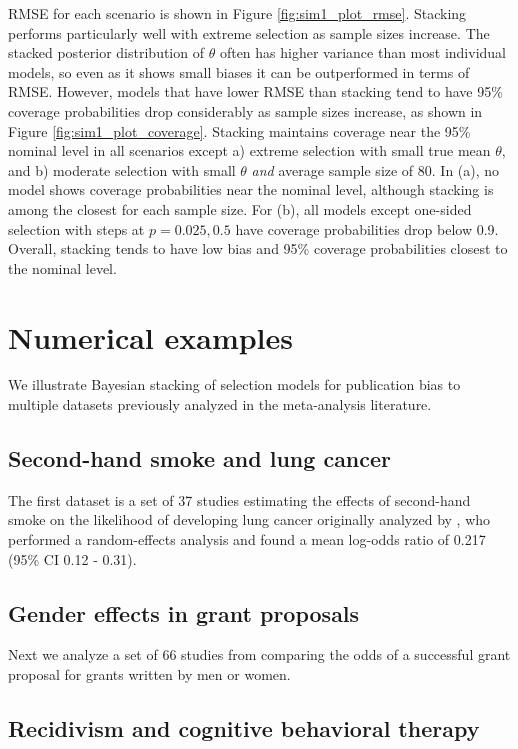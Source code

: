 \documentclass[12pt]{article}   	%
\numberwithin{equation}{section}
\begin{document}
RMSE for each scenario is shown in Figure \ref{fig:sim1_plot_rmse}. Stacking performs particularly well with extreme selection as sample sizes increase. The stacked posterior distribution of $\theta$ often has higher variance than most individual models, so even as it shows small biases it can be outperformed in terms of RMSE. However, models that have lower RMSE than stacking tend to have 95\% coverage probabilities drop considerably as sample sizes increase, as shown in Figure \ref{fig:sim1_plot_coverage}. Stacking maintains coverage near the 95\% nominal level in all scenarios except a) extreme selection with small true mean $\theta$, and b) moderate selection with small $\theta$ \textit{and} average sample size of 80. In (a), no model shows coverage probabilities near the nominal level, although stacking is among the closest for each sample size. For (b), all models except one-sided selection with steps at $p = 0.025, 0.5$ have coverage probabilities drop below 0.9. Overall, stacking tends to have low bias and 95\% coverage probabilities closest to the nominal level.

\section{Numerical examples} \label{sec:numex}

We illustrate Bayesian stacking of selection models for publication bias to multiple datasets previously analyzed in the meta-analysis literature. 

\subsection{Second-hand smoke and lung cancer}

The first dataset is a set of 37 studies estimating the effects of second-hand smoke on the likelihood of developing lung cancer originally analyzed by \citet{hackshaw1997}, who performed a random-effects analysis and found a mean log-odds ratio of 0.217 (95\% CI 0.12 - 0.31). 

\subsection{Gender effects in grant proposals}

Next we analyze a set of 66 studies from \citet{bornmann2007gender} comparing the odds of a successful grant proposal for grants written by men or women. 

\subsection{Recidivism and cognitive behavioral therapy} 
\end{document}
